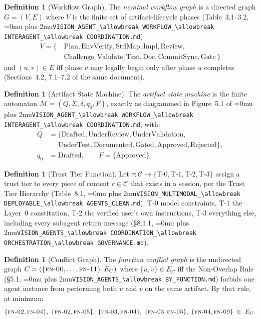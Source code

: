 \documentclass[12pt]{article}
\theoremstyle{definition}
\newtheorem{definition}[theorem]{Definition}
\DeclareRobustCommand{\code}[1]{\begingroup\Urlmuskip=0mu plus 2mu\relax\nolinkurl{#1}\endgroup}
\newcommand{\FN}[1]{\textsc{fn-#1}}
\newcommand{\VisionClean}{\code{VISION\_MULTIMODAL\_\allowbreak DEPLOYABLE\_\allowbreak AGENTS\_CLEAN.md}}
\newcommand{\VisionGov}{\code{VISION\_AGENTS\_\allowbreak COORDINATION\_\allowbreak ORCHESTRATION\_\allowbreak GOVERNANCE.md}}
\newcommand{\VisionFunc}{\code{VISION\_AGENTS\_\allowbreak BY\_FUNCTION.md}}
\newcommand{\VisionFlow}{\code{VISION\_AGENT\_\allowbreak WORKFLOW\_\allowbreak INTERAGENT\_\allowbreak COORDINATION.md}}
\begin{document}
\begin{definition}[Workflow Graph]
\label{def:workflow-graph}
The \emph{nominal workflow graph} is a directed graph
$G = (V, E)$ where $V$ is the finite set of artifact-lifecycle phases
(Table~3.1--3.2, \VisionFlow{}):
\begin{equation*}
  \begin{aligned}
    V = \{\ & \mathrm{Plan}, \mathrm{EnvVerify}, \mathrm{StdMap}, \mathrm{Impl}, \mathrm{Review}, \\
         & \mathrm{Challenge}, \mathrm{Validate}, \mathrm{Test}, \mathrm{Doc}, \mathrm{CommitSync}, \mathrm{Gate}\ \}
  \end{aligned}
\end{equation*}
and $(u,v) \in E$ iff phase $v$ may legally begin only after phase $u$
completes (Sections~4.2, 7.1--7.2 of the same document).
\end{definition}

\begin{definition}[Artifact State Machine]
\label{def:state-machine}
The \emph{artifact state machine} is the finite automaton
$\mathcal{M} = (Q, \Sigma, \delta, q_0, F)$, exactly as diagrammed in
Figure~5.1 of \VisionFlow{}, with:
\begin{equation*}
  \begin{aligned}
    Q &= \{\mathrm{Drafted}, \mathrm{UnderReview}, \mathrm{UnderValidation}, \\
      &\phantom{{}={}} \mathrm{UnderTest}, \mathrm{Documented}, \mathrm{Gated}, \mathrm{Approved}, \mathrm{Rejected}\}, \\
    q_0 &= \mathrm{Drafted}, \qquad F = \{\mathrm{Approved}\}
  \end{aligned}
\end{equation*}
\end{definition}

\begin{definition}[Trust Tier Function]
\label{def:trust}
Let $\tau : \mathcal{C} \to \{\mathrm{T\text{-}0}, \mathrm{T\text{-}1},
\mathrm{T\text{-}2}, \mathrm{T\text{-}3}\}$ assign a trust tier to every
piece of content $c \in \mathcal{C}$ that exists in a session, per the
Trust Tier Hierarchy (Table~8.1, \VisionClean{}): T-0 model constraints, T-1 the Layer~0
constitution, T-2 the verified user's own instructions, T-3 everything
else, including every subagent return message (\S8.1.1,
\VisionGov{}).
\end{definition}

\begin{definition}[Conflict Graph]
\label{def:conflict-graph}
The \emph{function conflict graph} is the undirected graph
$C = (\{\FN{00},\ldots,\FN{11}\}, E_C)$ where $\{u,v\} \in E_C$ iff the
Non-Overlap Rule (\S5.1, \VisionFunc{}) forbids
one agent instance from performing both $u$ and $v$ on the same artifact.
By that rule, at minimum:
\begin{equation*}
  \{\FN{02},\FN{04}\},\ \{\FN{02},\FN{05}\},\ \{\FN{03},\FN{04}\},\ \{\FN{03},\FN{05}\},\ \{\FN{04},\FN{09}\} \ \in\ E_C.
\end{equation*}
\end{definition}
\end{document}
